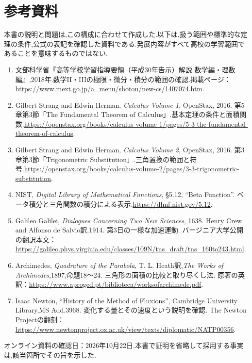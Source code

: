 \chapter*{参考資料}
本書の説明と問題は,この構成に合わせて作成した.以下は,扱う範囲や標準的な定理の条件,公式の表記を確認した資料である.発展内容がすべて高校の学習範囲であることを意味するものではない.
\begin{enumerate}[leftmargin=*]
\item 文部科学省『高等学校学習指導要領（平成30年告示）解説 数学編・理数編』,2018年.数学II・IIIの極限・微分・積分の範囲の確認.掲載ページ：\url{https://www.mext.go.jp/a_menu/shotou/new-cs/1407074.htm}.
\item Gilbert Strang and Edwin Herman, \textit{Calculus Volume 1}, OpenStax, 2016. 第5章第3節「The Fundamental Theorem of Calculus」.基本定理の条件と面積関数.\url{https://openstax.org/books/calculus-volume-1/pages/5-3-the-fundamental-theorem-of-calculus}.
\item Gilbert Strang and Edwin Herman, \textit{Calculus Volume 2}, OpenStax, 2016. 第3章第3節「Trigonometric Substitution」.三角置換の範囲と符号.\url{https://openstax.org/books/calculus-volume-2/pages/3-3-trigonometric-substitution}.
\item NIST, \textit{Digital Library of Mathematical Functions}, \S5.12, ``Beta Function''. ベータ積分と三角関数の積分による表示.\url{https://dlmf.nist.gov/5.12}.

\item Galileo Galilei, \textit{Dialogues Concerning Two New Sciences}, 1638. Henry Crew and Alfonso de Salvio訳,1914. 第3日の一様な加速運動. バージニア大学公開の翻訳本文：\url{https://galileo.phys.virginia.edu/classes/109N/tns_draft/tns_160to243.html}.
\item Archimedes, \textit{Quadrature of the Parabola}, T. L. Heath訳,\textit{The Works of Archimedes},1897,命題18〜24. 三角形の面積の比較と取り尽くし法. 原著の英訳：\url{https://www.aproged.pt/biblioteca/worksofarchimede.pdf}.
\item Isaac Newton, ``History of the Method of Fluxions'', Cambridge University Library,MS Add.3968. 変化する量とその速度という説明を確認. The Newton Projectの翻刻：\url{https://www.newtonproject.ox.ac.uk/view/texts/diplomatic/NATP00356}.
\end{enumerate}
オンライン資料の確認日：2026年10月22日.本書で証明を省略して採用する事実は,該当箇所でその旨を示した.

